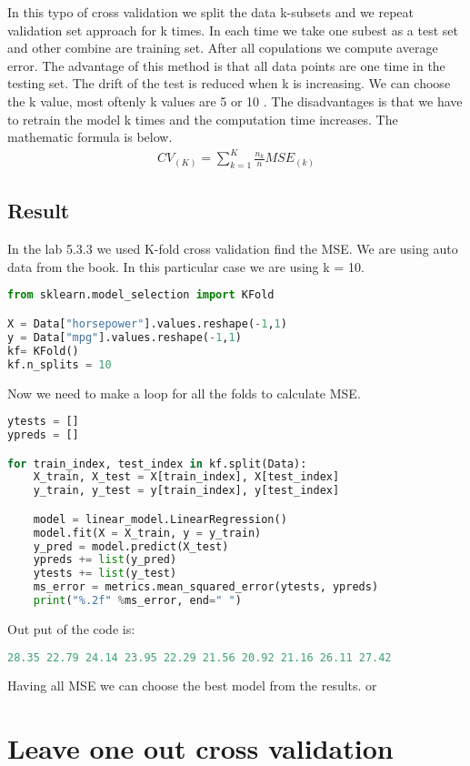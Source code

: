 In this typo of cross validation we split the data k-subsets and we repeat validation set approach for k times. In each time we take one subest as a test set and other combine are training set. After all copulations we compute average error. The advantage of this method is that all data points are one time in the testing set. The drift of the test is reduced when k is increasing. We can choose the k value, most oftenly k values are 5 or 10 . The disadvantages is that we have to retrain the model k times and the computation time increases. The mathematic formula is below. 
\begin{align}\label{fo:k-fold}
CV_{(K)} = \sum_{k=1}^{K}  \frac {n_{k}}{n}MSE_{(k)}
\end{align}

\subsection{Result}
In the lab 5.3.3 we used K-fold cross validation find the MSE. We are using auto data from the book. In this particular case we are using k = 10. 
\begin{lstlisting}[language=Python]
from sklearn.model_selection import KFold

X = Data["horsepower"].values.reshape(-1,1) 
y = Data["mpg"].values.reshape(-1,1)
kf= KFold()
kf.n_splits = 10
\end{lstlisting}
Now we need to make a loop for all the folds to calculate MSE.   

\begin{lstlisting}[language=Python]
ytests = []
ypreds = []

for train_index, test_index in kf.split(Data):
	X_train, X_test = X[train_index], X[test_index]
	y_train, y_test = y[train_index], y[test_index]

	model = linear_model.LinearRegression()
	model.fit(X = X_train, y = y_train)
	y_pred = model.predict(X_test)  
	ypreds += list(y_pred)
	ytests += list(y_test)
	ms_error = metrics.mean_squared_error(ytests, ypreds)
	print("%.2f" %ms_error, end=" ")
\end{lstlisting}
Out put of the code is:
\begin{lstlisting}[language=Python]
28.35 22.79 24.14 23.95 22.29 21.56 20.92 21.16 26.11 27.42 
\end{lstlisting}
Having all MSE we can choose the best model from the results. or 

\section {Leave one out cross validation}

